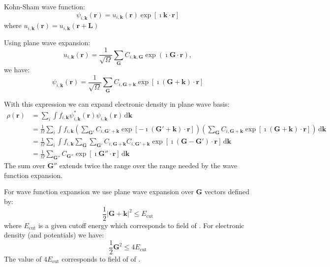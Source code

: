 Kohn-Sham wave function:
\begin{equation}
\psi_{i,\mathbf{k}}(\mathbf{r}) = u_{i,\mathbf{k}}(\mathbf{r}) \exp\left[ \imath \mathbf{k} \cdot \mathbf{r} \right]
\end{equation}
where $u_{i,\mathbf{k}}(\mathbf{r}) = u_{i,\mathbf{k}}(\mathbf{r}+\mathbf{L})$

Using plane wave expansion:
\begin{equation}
u_{i,\mathbf{k}}(\mathbf{r}) =
\frac{1}{\sqrt{\Omega}}\sum_{\mathbf{G}} C_{i,\mathbf{k},\mathbf{G}} \exp(\imath \mathbf{G} \cdot \mathbf{r}),
\end{equation}
%
we have:
\begin{equation}
\psi_{i,\mathbf{k}}(\mathbf{r}) =
\frac{1}{\sqrt{\Omega}}\sum_{\mathbf{G}} C_{i,\mathbf{G+\mathbf{k}}}
\exp\left[ \imath (\mathbf{G}+\mathbf{k}) \cdot \mathbf{r} \right]
\end{equation}

With this expression we can expand electronic density in plane wave basis:
\begin{align*}
\rho(\mathbf{r}) & = \sum_{i} \int f_{i,\mathbf{k}}
\psi^{*}_{i,\mathbf{k}}(\mathbf{r}) \psi_{i,\mathbf{k}}(\mathbf{r})
\,\mathrm{d}\mathbf{k} \\
%
& = \frac{1}{\Omega} \sum_{i} \int f_{i,\mathbf{k}}
\left(
\sum_{\mathbf{G}'} C_{i,\mathbf{G'+\mathbf{k}}}
\exp\left[ -\imath (\mathbf{G}'+\mathbf{k}) \cdot \mathbf{r} \right]
\right)
%
\left(
\sum_{\mathbf{G}} C_{i,\mathbf{G+\mathbf{k}}}
\exp\left[ \imath (\mathbf{G}+\mathbf{k}) \cdot \mathbf{r} \right]
\right)
\,\mathrm{d}\mathbf{k} \\
%
& = \frac{1}{\Omega} \sum_{i} \int f_{i,\mathbf{k}}
\sum_{\mathbf{G}} \sum_{\mathbf{G}'}
C_{i,\mathbf{G+\mathbf{k}}} C_{i,\mathbf{G'+\mathbf{k}}}
\exp\left[ \imath (\mathbf{G}-\mathbf{G}') \cdot \mathbf{r} \right]
\,\mathrm{d}\mathbf{k} \\
%
& = \frac{1}{\Omega} \sum_{\mathbf{G}''}
C_{\mathbf{G}''} \exp\left[ \imath \mathbf{G}'' \cdot \mathbf{r} \right]
\,\mathrm{d}\mathbf{k}
\end{align*}
The sum over $\mathbf{G}''$ extends twice the range over the range needed
by the wave function expansion.

For wave function expansion we use plane wave expansion over $\mathbf{G}$
vectors defined by:
\begin{equation}
\frac{1}{2} \left| \mathbf{G} + \mathbf{k} \right|^2 \leq E_{\mathrm{cut}}
\label{eq:ecutwfc_def}
\end{equation}
where $E_{\mathrm{cut}}$ is a given cutoff energy which corresponds
to  field of .
For electronic density (and potentials) we have:
\begin{equation}
\frac{1}{2} \mathbf{G}^2 \leq 4 E_{\mathrm{cut}}
\label{eq:ecutrho_def}
\end{equation}
The value of $4 E_{\mathrm{cut}}$ corresponds to  field of
of .

